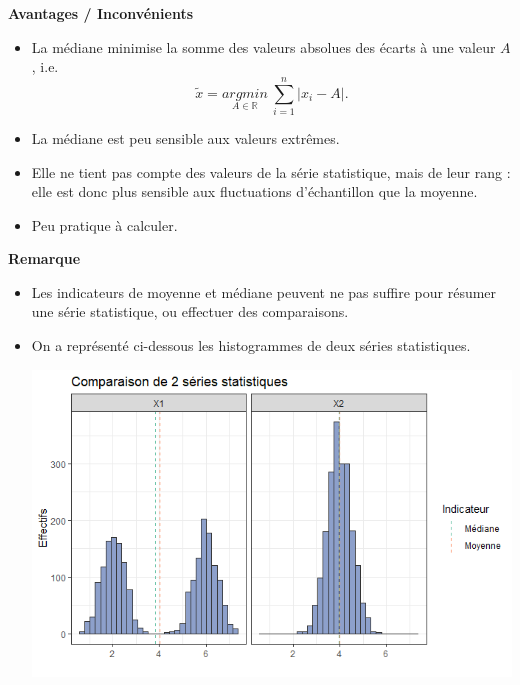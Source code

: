 \documentclass[aspectratio=169,xcolor=dvipsnames]{beamer}
\newcommand{\R}{\mathbb{R}}
\newcommand{\argmin}{argmin}
\begin{document}
\begin{frame}
	\begin{exampleblock}{\textbf{Avantages / Inconvénients}}
		\begin{itemize}
		\item[\faPlusCircle] La médiane minimise la somme des valeurs absolues des écarts à une valeur $A$, i.e.
			\[
			\widetilde{x} = \underset{A \in \R}{\argmin} \ \sum_{i=1}^n \left| x_i-A\right|.
			\]
		\item[\faPlusCircle] La médiane est peu sensible aux valeurs extrêmes.
		\item[\faMinusCircle] Elle ne tient pas compte des valeurs de la série statistique, mais de leur rang : elle est donc plus sensible aux fluctuations d'échantillon que la moyenne.
		\item[\faMinusCircle] Peu pratique à calculer.
		\end{itemize}
	\end{exampleblock}
\end{frame}

\begin{frame}
	\begin{exampleblock}{\textbf{Remarque}}
		\begin{itemize}
		\item Les indicateurs de moyenne et médiane peuvent ne pas suffire pour résumer une série statistique, ou effectuer des comparaisons.
		\item On a représenté ci-dessous les histogrammes de deux séries statistiques.
			\begin{center}
			\includegraphics[scale=0.5]{comp_moy_med.png}
			\end{center}
		\end{itemize}

	\end{exampleblock}
\end{frame}
\end{document}
